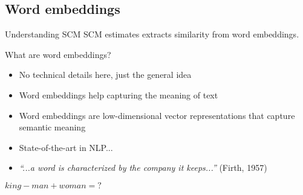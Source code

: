 \subsection{Word embeddings}

\begin{frame}{Understanding SCM}
SCM estimates extracts similarity from \alert{word embeddings}. 
	\begin{block}{What are word embeddings?}
		\begin{itemize}[<+>]
			\item No technical details here, just the general idea
			\item Word embeddings help capturing the meaning of text
			\item Word embeddings are low-dimensional vector representations that capture semantic meaning
			\item State-of-the-art in NLP...
			\item \emph{``...a word is characterized by the company it keeps...''} (Firth, 1957)
		\end{itemize}
	\end{block}
\end{frame}

\iffalse
\begin{frame}{}
\end{frame}

\begin{frame}{}
\end{frame}


\begin{frame}{}
	
	$king-man+woman = ?$ 
\end{frame}


\begin{frame}{}
\end{frame}


\begin{frame}{}
\end{frame}

